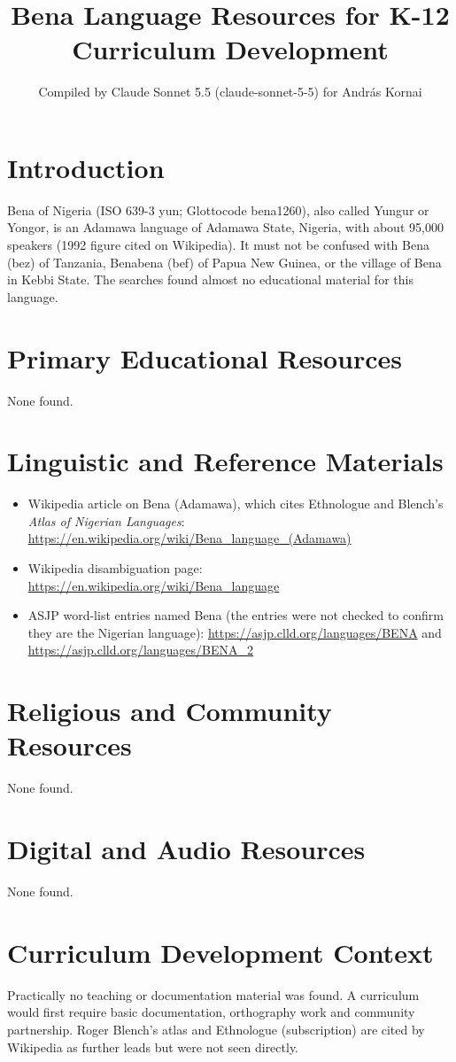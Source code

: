 \documentclass[12pt]{article}
\title{Bena Language Resources for K-12 Curriculum Development}
\author{Compiled by Claude Sonnet 5.5 (claude-sonnet-5-5) for Andr\'as Kornai}
\date{}
\begin{document}
\maketitle

\section{Introduction}
Bena of Nigeria (ISO 639-3 yun; Glottocode bena1260), also called Yungur or Yongor, is an Adamawa language of Adamawa State, Nigeria, with about 95,000 speakers (1992 figure cited on Wikipedia). It must not be confused with Bena (bez) of Tanzania, Benabena (bef) of Papua New Guinea, or the village of Bena in Kebbi State. The searches found almost no educational material for this language.

\section{Primary Educational Resources}
None found.

\section{Linguistic and Reference Materials}
\begin{itemize}
\item Wikipedia article on Bena (Adamawa), which cites Ethnologue and Blench's \emph{Atlas of Nigerian Languages}: \url{https://en.wikipedia.org/wiki/Bena_language_(Adamawa)}
\item Wikipedia disambiguation page: \url{https://en.wikipedia.org/wiki/Bena_language}
\item ASJP word-list entries named Bena (the entries were not checked to confirm they are the Nigerian language): \url{https://asjp.clld.org/languages/BENA} and \url{https://asjp.clld.org/languages/BENA_2}
\end{itemize}

\section{Religious and Community Resources}
None found.

\section{Digital and Audio Resources}
None found.

\section{Curriculum Development Context}
Practically no teaching or documentation material was found. A curriculum would first require basic documentation, orthography work and community partnership. Roger Blench's atlas and Ethnologue (subscription) are cited by Wikipedia as further leads but were not seen directly.
\end{document}
